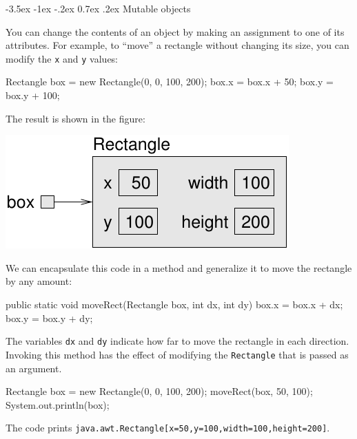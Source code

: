 \documentclass[12pt]{book}
\makeatletter
\theoremstyle{exercise}
\newcommand{\java}[1]{\verb"#1"}
\renewcommand{\section}{\@startsection{section}{1}{\z@}%
    {-3.5ex \@plus -1ex \@minus -.2ex}%
    {0.7ex \@plus.2ex}%
    {\normalfont\Large\bfseries}}
\newcommand{\java}[1]{\lstinline{#1}} %
\makeatother
\begin{document}
\section{Mutable objects}


You can change the contents of an object by making an assignment to one of its attributes.
For example, to ``move'' a rectangle without changing its size, you can modify the \java{x} and \java{y} values:

\begin{code}
    Rectangle box = new Rectangle(0, 0, 100, 200);
    box.x = box.x + 50;
    box.y = box.y + 100;
\end{code}

The result is shown in the figure:

\begin{center}
\includegraphics{figs/rectangle2.pdf}
\end{center}


We can encapsulate this code in a method and generalize it to move the rectangle by any amount:

\begin{code}
    public static void moveRect(Rectangle box, int dx, int dy) {
        box.x = box.x + dx;
        box.y = box.y + dy;
    }
\end{code}

The variables \java{dx} and \java{dy} indicate how far to move the rectangle in each direction.
Invoking this method has the effect of modifying the \java{Rectangle} that is passed as an argument.

\begin{code}
    Rectangle box = new Rectangle(0, 0, 100, 200);
    moveRect(box, 50, 100);
    System.out.println(box);
\end{code}

The code prints \java{java.awt.Rectangle[x=50,y=100,width=100,height=200]}.
\end{document}
